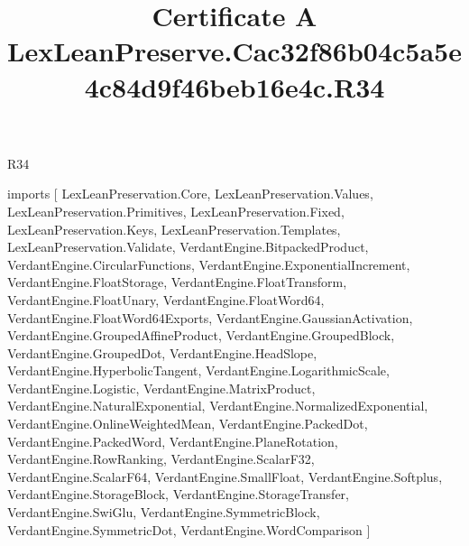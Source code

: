 \begin{lexlean}{R34}
\title{Certificate A LexLeanPreserve.Cac32f86b04c5a5e4c84d9f46beb16e4c.R34}
\begin{coremodule}
imports [
  LexLeanPreservation.Core,
  LexLeanPreservation.Values,
  LexLeanPreservation.Primitives,
  LexLeanPreservation.Fixed,
  LexLeanPreservation.Keys,
  LexLeanPreservation.Templates,
  LexLeanPreservation.Validate,
  VerdantEngine.BitpackedProduct,
  VerdantEngine.CircularFunctions,
  VerdantEngine.ExponentialIncrement,
  VerdantEngine.FloatStorage,
  VerdantEngine.FloatTransform,
  VerdantEngine.FloatUnary,
  VerdantEngine.FloatWord64,
  VerdantEngine.FloatWord64Exports,
  VerdantEngine.GaussianActivation,
  VerdantEngine.GroupedAffineProduct,
  VerdantEngine.GroupedBlock,
  VerdantEngine.GroupedDot,
  VerdantEngine.HeadSlope,
  VerdantEngine.HyperbolicTangent,
  VerdantEngine.LogarithmicScale,
  VerdantEngine.Logistic,
  VerdantEngine.MatrixProduct,
  VerdantEngine.NaturalExponential,
  VerdantEngine.NormalizedExponential,
  VerdantEngine.OnlineWeightedMean,
  VerdantEngine.PackedDot,
  VerdantEngine.PackedWord,
  VerdantEngine.PlaneRotation,
  VerdantEngine.RowRanking,
  VerdantEngine.ScalarF32,
  VerdantEngine.ScalarF64,
  VerdantEngine.SmallFloat,
  VerdantEngine.Softplus,
  VerdantEngine.StorageBlock,
  VerdantEngine.StorageTransfer,
  VerdantEngine.SwiGlu,
  VerdantEngine.SymmetricBlock,
  VerdantEngine.SymmetricDot,
  VerdantEngine.WordComparison
]


\end{coremodule}
\end{lexlean}

